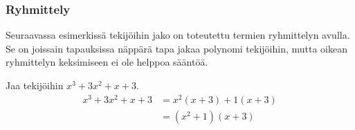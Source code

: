 %
%
%
%
%


\subsubsection*{Ryhmittely}

Seuraavassa esimerkissä tekijöihin jako on toteutettu termien ryhmittelyn avulla. Se on joissain tapauksissa näppärä tapa jakaa polynomi tekijöihin, mutta oikean ryhmittelyn keksimiseen ei ole helppoa sääntöä.

\begin{esimerkki}
Jaa tekijöihin $x^3+3x^2+x+3$.
\begin{align*}
x^3+3x^2+x+3 &=x^2(x+3)+1(x+3) \\ &=(x^2+1)(x+3)
\end{align*}
\end{esimerkki}

